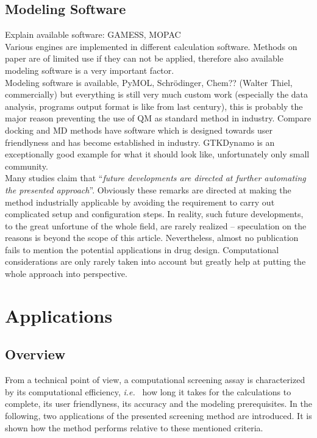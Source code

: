 \subsection{Modeling Software}\label{sec:software}
Explain available software: GAMESS, MOPAC\\
Various engines are implemented in different calculation software.
Methods on paper are of limited use if they can not be applied, therefore also available modeling software is a very important factor.\\
Modeling software is available, PyMOL, Schr\"odinger, Chem?? (Walter Thiel, commercially) but everything is still very much custom work (especially the data analysis, programs output format is like from last century), this is probably the major reason preventing the use of QM as standard method in industry.
Compare docking and MD methods have software which is designed towards user friendlyness and has become established in industry.
GTKDynamo is an exceptionally good example for what it should look like, unfortunately only small community.\\
Many studies claim that ``\textit{future developments are directed at further automating the presented approach}''.
Obviously these remarks are directed at making the method industrially applicable by avoiding the requirement to carry out complicated setup and configuration steps\cite{rathore2013advances}.
In reality, such future developments, to the great unfortune of the whole field, are rarely realized -- speculation on the reasons is beyond the scope of this article.
Nevertheless, almost no publication fails to mention the potential applications in drug design.
Computational considerations are only rarely taken into account but greatly help at putting the whole approach into perspective\cite{buch2011complete}.




\clearpage
\section{Applications}\label{sec:apps}

\subsection{Overview}\label{sec:overview}
From a technical point of view, a computational screening assay is characterized by its computational efficiency, \textit{i.e. } how long it takes for the calculations to complete, its user friendlyness, its accuracy and the modeling prerequisites.
In the following, two applications of the presented screening method are introduced.
It is shown how the method performs relative to these mentioned criteria.

